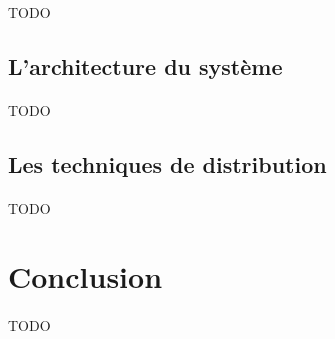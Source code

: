 \documentclass{article}
\begin{document}
  \paragraph{} TODO
\subsection{L’architecture du système}
  \paragraph{} TODO
\subsection{Les techniques de distribution}
  \paragraph{} TODO

\newpage
\section{Conclusion}
  \paragraph{} TODO
  
\end{document}
